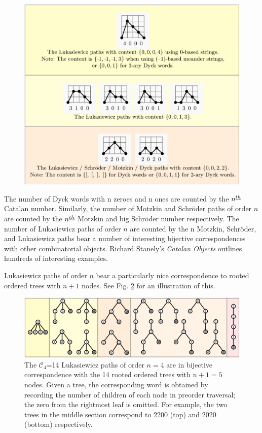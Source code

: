 \begin{figure}[]
	\centering
	\includegraphics[width = .95 \textwidth]{paths.png}
	\caption{}
	\label{fig:paths}
\end{figure}


The number of Dyck words with n zeroes and n ones are counted by the $n^{\underline{th}}$ Catalan number.  Similarly, the number of Motzkin and Schröder paths of order $n$ are counted by the $n^{\underline{th}}$ Motzkin and big Schröder number respectively. The number of Lukasiewicz paths of order $n$ are counted by the n
Motzkin, Schröder, and Lukasiewicz paths bear a number of interesting bijective correspondences with other combinatorial objects. Richard Stanely's \emph{Catalan Objects} outlines hundreds of interesting examples.  

Lukasiewicz paths  of order $n$ bear a particularly nice correspondence to rooted ordered trees with $n+1$ nodes. See Fig. \ref{trees} for an illustration of this.

\begin{figure}[]
	\centering
	\includegraphics[width = .95 \textwidth]{trees.png}
	\caption{The $\mathcal{C}_4$=14 Lukasiewicz paths of order $n=4$ are in bijective correspondence with the 14 rooted ordered trees with $n+1=5$ nodes.  Given a tree, the corresponding word is obtained by recording the number of children of each node in preorder traversal; the zero from the rightmost leaf is omitted.  For example, the two trees in the middle section correspond to 2200 (top) and 2020 (bottom) respectively.}
	\label{trees}
\end{figure}



